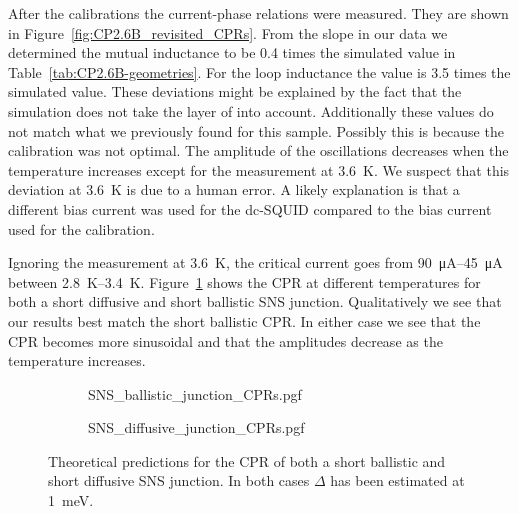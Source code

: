 After the calibrations the current-phase relations were measured. They are shown in Figure~\ref{fig:CP2.6B_revisited_CPRs}. From the slope in our data we determined the mutual inductance to be 0.4 times the simulated value in Table~\ref{tab:CP2.6B-geometries}. For the loop inductance the value is 3.5 times the simulated value. These deviations might be explained by the fact that the simulation does not take the layer of  into account. Additionally these values do not match what we previously found for this sample. Possibly this is because the calibration was not optimal. The amplitude of the oscillations decreases when the temperature increases except for the measurement at \qty{3.6}{\kelvin}. We suspect that this deviation at \qty{3.6}{\kelvin} is due to a human error. A likely explanation is that a different bias current was used for the dc-SQUID compared to the bias current used for the calibration.

Ignoring the measurement at \qty{3.6}{\kelvin}, the critical current goes from \qtyrange{90}{45}{\micro\ampere} between \qtyrange{2.8}{3.4}{\kelvin}. Figure~\ref{fig:SNS_junction_predictions} shows the CPR at different temperatures for both a short diffusive and short ballistic SNS junction. Qualitatively we see that our results best match the short ballistic CPR. In either case we see that the CPR becomes more sinusoidal and that the amplitudes decrease as the temperature increases.

\begin{figure}[ht!]
	\begin{subfigure}[t]{\textwidth}
		\centering
		{SNS_ballistic_junction_CPRs.pgf}
	\end{subfigure}
	\hfill
	\begin{subfigure}[t]{\textwidth}
		\centering
		{SNS_diffusive_junction_CPRs.pgf}
	\end{subfigure}

	\caption{Theoretical predictions for the CPR of both a short ballistic and short diffusive SNS junction. In both cases $\Delta$ has been estimated at \qty{1}{\milli\electronvolt}.}
	\label{fig:SNS_junction_predictions}
\end{figure}

